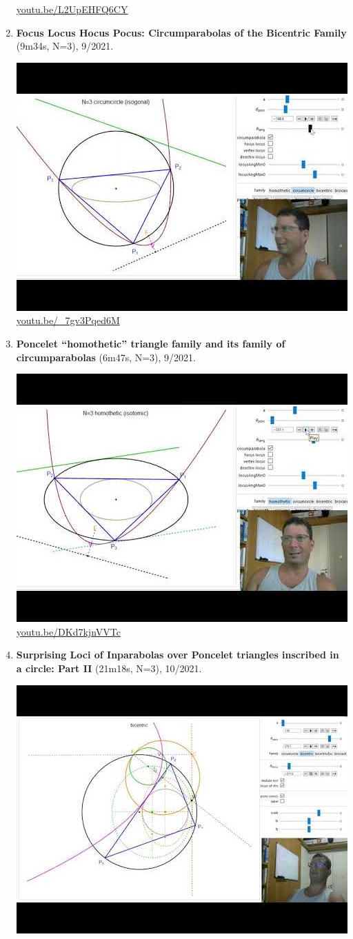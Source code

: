 \documentclass[12pt]{amsart}
\begin{document}
\begin{enumerate}[resume]
\begin{center}
\href{https://youtu.be/L2UpEHFQ6CY}{\url{youtu.be/L2UpEHFQ6CY}}\end{center}
% 
\item \textbf{Focus Locus Hocus Pocus: Circumparabolas of the Bicentric Family} (9m34s, N=3), 9/2021. 
\begin{center}\includegraphics[width=.5\textwidth]{pics/_7gv3Pqed6M.jpg} \\ 
\href{https://youtu.be/_7gv3Pqed6M}{\url{youtu.be/\_7gv3Pqed6M}}\end{center}
% 
\item \textbf{Poncelet ``homothetic'' triangle family and its family of circumparabolas} (6m47s, N=3), 9/2021. 
\begin{center}\includegraphics[width=.5\textwidth]{pics/DKd7kjnVVTc.jpg} \\ 
\href{https://youtu.be/DKd7kjnVVTc}{\url{youtu.be/DKd7kjnVVTc}}\end{center}
% 
\item \textbf{Surprising Loci of Inparabolas over Poncelet triangles inscribed in a circle: Part II} (21m18s, N=3), 10/2021. 
\begin{center}\includegraphics[width=.5\textwidth]{pics/qicI7zl7ICM.jpg} \\ 

\end{center}
\end{enumerate}
\end{document}
